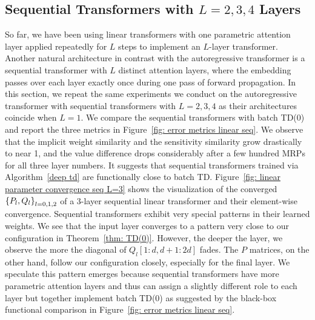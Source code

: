 \documentclass{article}
\begin{document}
\subsection[Sequential Transformers with L = 2, 3, 4 Layers]{Sequential Transformers with $L=2,3,4$ Layers}
\label{appendix: sequential linear}
So far, we have been using linear transformers with one parametric attention layer applied repeatedly for $L$ steps to implement an $L$-layer transformer.
Another natural architecture in contrast with the autoregressive transformer is a sequential transformer with $L$ distinct attention layers, where the embedding passes over each layer exactly once during one pass of forward propagation.
In this section, we repeat the same experiments we conduct on the autoregressive transformer with sequential transformers with $L = 2, 3, 4$ as their architectures coincide when $L=1$.
We compare the sequential transformers with batch TD(0) and report the three metrics
in Figure~\ref{fig: error metrics linear seq}.
We observe that the implicit weight similarity and the sensitivity similarity grow drastically to near 1,
and the value difference drops considerably after a few hundred MRPs for all three layer numbers.
It suggests that sequential transformers trained via Algorithm~\ref{deep td} are functionally close to batch TD.
Figure~\ref{fig: linear parameter convergence seq L=3} shows the visualization of the converged $\qty{P_l, Q_l}_{l=0,1,2}$ of a 3-layer sequential linear transformer and their element-wise convergence.
Sequential transformers exhibit very special patterns in their learned weights.
We see that the input layer converges to a pattern very close to our configuration in Theorem~\eqref{thm: TD(0)}.
However, the deeper the layer, we observe the more the diagonal of $Q_l[1:d, d+1:2d]$ fades.
The $P$ matrices, on the other hand, follow our configuration closely, especially for the final layer.
We speculate this pattern emerges because sequential transformers have more parametric attention layers and thus can assign a slightly different role to each layer but together implement batch TD(0) as suggested by the black-box functional comparison in Figure~\ref{fig: error metrics linear seq}.
\end{document}
